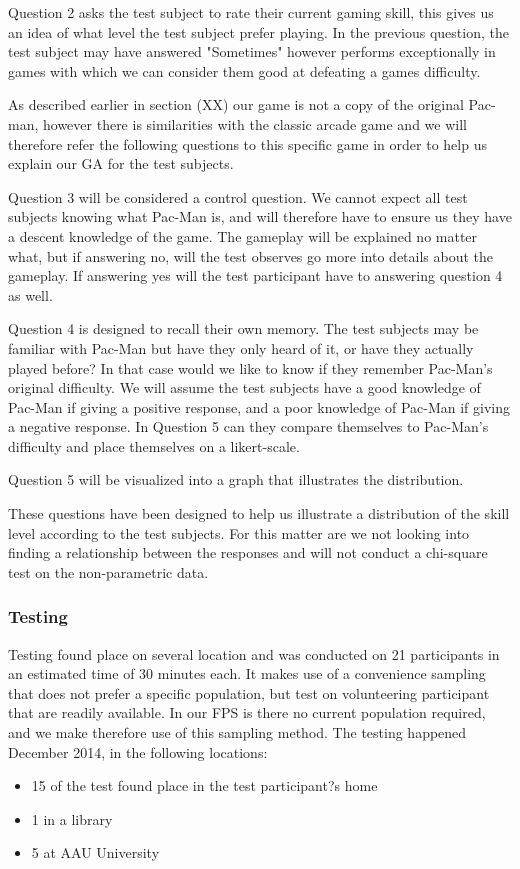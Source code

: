 Question 2 asks the test subject to rate their current gaming skill, this gives us an idea of what level the test subject prefer playing. In the previous question, the test subject may have answered "Sometimes" however performs exceptionally in games with which we can consider them good at defeating a games difficulty.  

As described earlier in section (XX) our game is not a copy of the original Pac-man, however there is similarities with the classic arcade game and we will therefore refer the following questions to this specific game in order to help us explain our GA for the test subjects. 

Question 3 will be considered a control question. We cannot expect all test subjects knowing what Pac-Man is, and will therefore have to ensure us they have a descent knowledge of the game. The gameplay will be explained no matter what, but if answering no, will the test observes go more into details about the gameplay. If answering yes will the test participant have to answering question 4 as well. 

Question 4 is designed to recall their own memory. The test subjects may be familiar with Pac-Man but have they only heard of it, or have they actually played before? In that case would we like to know if they remember Pac-Man's original difficulty. We will assume the test subjects have a good knowledge of Pac-Man if giving a positive response, and a poor knowledge of Pac-Man if giving a negative response. In Question 5 can they compare themselves to Pac-Man's difficulty and place themselves on a likert-scale.

Question 5 will be visualized into a graph that illustrates the distribution. 

These questions have been designed to help us illustrate a distribution of the skill level according to the test subjects. For this matter are we not looking into finding a relationship between the responses and will not conduct a chi-square test on the non-parametric data. 
 
\subsubsection{Testing}
Testing found place on several location and was conducted on 21 participants in an estimated time of 30 minutes each. 
It makes use of a convenience sampling that does not prefer a specific population, but test on volunteering participant that are readily available. \cite{Exploarable2009} In our FPS is there no current population required, and we make therefore use of this sampling method. The testing happened December 2014, in the following locations: 
\begin{itemize}
\item 15 of the test found place in the test participant?s home 
\item 1 in a library 
\item 5 at AAU University
 \end{itemize}

